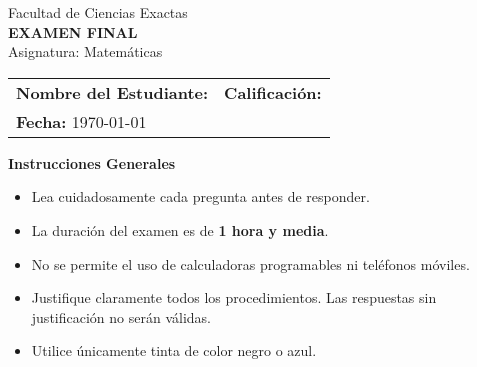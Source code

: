 \documentclass[12pt]{article}
\newcommand{\fecha}{\today}
\begin{document}
\begin{center}
    {\normalsize Facultad de Ciencias Exactas}\\[0.5cm]
    {\Large\bfseries EXAMEN FINAL}\\[0.3cm]
    {\large Asignatura: Matemáticas}
\end{center}

\vspace{0.8cm} %

\noindent
\begin{tabular}{p{} p{}}
    \textbf{Nombre del Estudiante:} \underline{\hspace{5.5cm}} & \textbf{Calificación:} \underline{\hspace{1.5cm}} \\[1cm] %
    \textbf{Fecha:} \fecha & \\
\end{tabular}

\vspace{1cm}

\begin{center}
    \textbf{Instrucciones Generales}
\end{center}
\begin{itemize}
    \item Lea cuidadosamente cada pregunta antes de responder.
    \item La duración del examen es de \textbf{1 hora y media}.
    \item No se permite el uso de calculadoras programables ni teléfonos móviles.
    \item Justifique claramente todos los procedimientos. Las respuestas sin justificación no serán válidas.
    \item Utilice únicamente tinta de color negro o azul.
\end{itemize}

\vspace{1cm}
\end{document}
